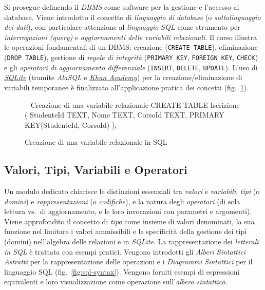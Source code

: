 \documentclass[withtimes]{easychair}
\theoremstyle{definition}
\begin{document}
Si prosegue definendo il \emph{DBMS} come software per la gestione e l'accesso ai database. Viene introdotto il concetto di \emph{linguaggio di database} (o \emph{sottolinguaggio dei dati}), con particolare attenzione al \emph{linguaggio SQL} come strumento per \emph{interrogazioni (query)} e \emph{aggiornamenti delle variabili relazionali}. Il corso illustra le operazioni fondamentali di un DBMS: creazione (\texttt{CREATE\ TABLE}), eliminazione (\texttt{DROP\ TABLE}), gestione di \emph{regole di integrità} (\texttt{PRIMARY\ KEY}, \texttt{FOREIGN\ KEY}, \texttt{CHECK}) e gli \emph{operatori di aggiornamento differenziale} (\texttt{INSERT}, \texttt{DELETE}, \texttt{UPDATE}). L'uso di \href{https://sqlite.org/}{\emph{SQLite}} (tramite  \emph{AlaSQL} e \href{https://it.khanacademy.org/computer-programming/new/sql}{\emph{Khan Academy}}) per la creazione/eliminazione di variabili temporanee è finalizzato all'applicazione pratica dei concetti (fig.~\ref{fig:sql-create-instance}).


\begin{figure}[ht]
  \centering
  \begin{pygmented}[lang=sql]
-- Creazione di una variabile relazionale
CREATE TABLE Iscrizione (
  StudenteId TEXT,
  Nome TEXT,
  CorsoId TEXT,
  PRIMARY KEY(StudenteId, CorsoId)
);
  \end{pygmented}
  \caption{Creazione di una variabile relazionale in SQL}
  \label{fig:sql-create-instance}
\end{figure}


\subsection{Valori, Tipi, Variabili e Operatori}\label{valori-tipi-variabili-e-operatori}

Un modulo dedicato chiarisce le distinzioni essenziali tra \emph{valori} e \emph{variabili}, \emph{tipi} (o \emph{domini}) e \emph{rappresentazioni}
(o \emph{codifiche}), e la natura degli \emph{operatori} (di sola lettura vs.~di aggiornamento, e le loro invocazioni con parametri e argomenti). Viene approfondito il concetto di \emph{tipo} come insieme di valori denominati, la sua funzione nel limitare i valori ammissibili e le specificità della gestione dei tipi (domini) nell'algebra delle relazioni e in \emph{SQLite}. La rappresentazione dei \emph{letterali in SQL} è trattata con esempi pratici. Vengono introdotti gli \emph{Alberi Sintattici Astratti} per la rappresentazione delle operazioni e i \emph{Diagrammi Sintattici} per il linguaggio SQL (fig.~\ref{fig:sql-syntax}). Vengono forniti esempi di espressioni equivalenti e loro visualizzazione come operazione sull'\emph{albero sintattico}.
\end{document}
